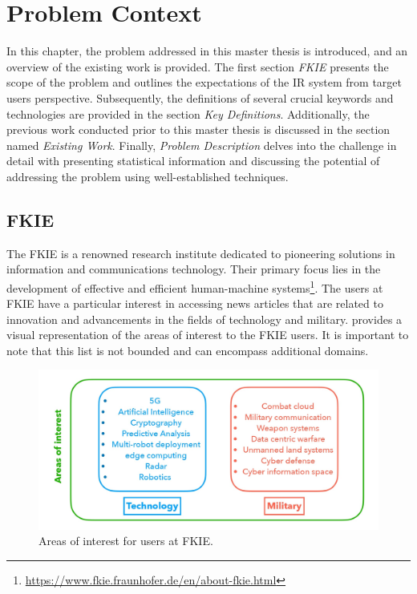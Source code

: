 
\chapter{Problem Context}

In this chapter, the problem addressed in this master thesis is introduced, and an overview of the existing work is provided. The first section \emph{FKIE} presents the scope of the problem and outlines the expectations of the \ac{IR} system from target users perspective. Subsequently, the definitions of several crucial keywords and technologies are provided in the section \emph{Key Definitions}. Additionally, the previous work conducted prior to this master thesis is discussed in the section named \emph{Existing Work}. Finally, \emph{Problem Description} delves into the challenge in detail with presenting statistical information and discussing the potential of addressing the problem using well-established techniques.

	\section{FKIE}

The \ac{FKIE} is a renowned research institute dedicated to pioneering solutions in information and communications technology. Their primary focus lies in the development of effective and efficient human-machine systems\footnote{\url{https://www.fkie.fraunhofer.de/en/about-fkie.html}}. The users at \ac{FKIE} have a particular interest in accessing news articles that are related to  innovation and advancements in the fields of technology and military.  provides a visual representation of the areas of interest to the \ac{FKIE} users. It is important to note that this list is not bounded and can encompass additional domains.

\begin{figure}[h!]
	\centering
	\includegraphics[width=.8\textwidth]{images/keynotes_images/areas_of_interest.jpg}
	\caption[Areas of interest for users at FKIE.]{Areas of interest for users at FKIE. \label{fig:areas_of_interest}}
\end{figure} 

